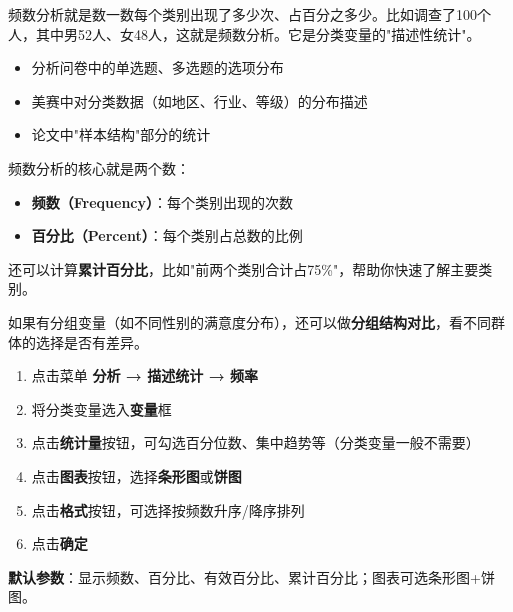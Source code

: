 
\begin{algointro}
频数分析就是数一数每个类别出现了多少次、占百分之多少。比如调查了100个人，其中男52人、女48人，这就是频数分析。它是分类变量的"描述性统计"。
\end{algointro}

\begin{algoscene}
\begin{itemize}
    \item 分析问卷中的单选题、多选题的选项分布
    \item 美赛中对分类数据（如地区、行业、等级）的分布描述
    \item 论文中"样本结构"部分的统计
\end{itemize}
\end{algoscene}

\begin{algoprinciple}
频数分析的核心就是两个数：
\begin{itemize}
    \item \textbf{频数（Frequency）}：每个类别出现的次数
    \item \textbf{百分比（Percent）}：每个类别占总数的比例
\end{itemize}

还可以计算\textbf{累计百分比}，比如"前两个类别合计占75\%"，帮助你快速了解主要类别。

如果有分组变量（如不同性别的满意度分布），还可以做\textbf{分组结构对比}，看不同群体的选择是否有差异。
\end{algoprinciple}

\begin{algosposs}
\begin{enumerate}
    \item 点击菜单 \textbf{分析 → 描述统计 → 频率}
    \item 将分类变量选入\textbf{变量}框
    \item 点击\textbf{统计量}按钮，可勾选百分位数、集中趋势等（分类变量一般不需要）
    \item 点击\textbf{图表}按钮，选择\textbf{条形图}或\textbf{饼图}
    \item 点击\textbf{格式}按钮，可选择按频数升序/降序排列
    \item 点击\textbf{确定}
\end{enumerate}

\textbf{默认参数}：显示频数、百分比、有效百分比、累计百分比；图表可选条形图+饼图。
\end{algosposs}

